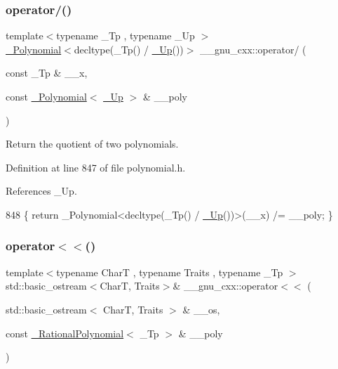 \subsubsection{\texorpdfstring{operator/()}{operator/()}\hspace{0.1cm}{\footnotesize\ttfamily [3/3]}}
{\footnotesize\ttfamily template$<$typename \+\_\+\+Tp , typename \+\_\+\+Up $>$ \\
\hyperlink{class____gnu__cxx_1_1__Polynomial}{\+\_\+\+Polynomial}$<$decltype(\+\_\+\+Tp() / \hyperlink{namespace____gnu__cxx_ab693ea357b6429b331e0bf09f9442385}{\+\_\+\+Up}())$>$ \+\_\+\+\_\+gnu\+\_\+cxx\+::operator/ (\begin{DoxyParamCaption}\item[{const \+\_\+\+Tp \&}]{\+\_\+\+\_\+x,  }\item[{const \hyperlink{class____gnu__cxx_1_1__Polynomial}{\+\_\+\+Polynomial}$<$ \hyperlink{namespace____gnu__cxx_ab693ea357b6429b331e0bf09f9442385}{\+\_\+\+Up} $>$ \&}]{\+\_\+\+\_\+poly }\end{DoxyParamCaption})\hspace{0.3cm}{\ttfamily [inline]}}

Return the quotient of two polynomials. 

Definition at line 847 of file polynomial.\+h.



References \+\_\+\+Up.


\begin{DoxyCode}
848     \{ \textcolor{keywordflow}{return} \_Polynomial<decltype(\_Tp() / \hyperlink{namespace____gnu__cxx_ab693ea357b6429b331e0bf09f9442385}{\_Up}())>(\_\_x) /= \_\_poly; \}
\end{DoxyCode}
\mbox{\label{namespace____gnu__cxx_a424044092ac184bfa1d17beb1b12e071}} 
\subsubsection{\texorpdfstring{operator$<$$<$()}{operator<<()}\hspace{0.1cm}{\footnotesize\ttfamily [1/2]}}
{\footnotesize\ttfamily template$<$typename CharT , typename Traits , typename \+\_\+\+Tp $>$ \\
std\+::basic\+\_\+ostream$<$CharT, Traits$>$\& \+\_\+\+\_\+gnu\+\_\+cxx\+::operator$<$$<$ (\begin{DoxyParamCaption}\item[{std\+::basic\+\_\+ostream$<$ CharT, Traits $>$ \&}]{\+\_\+\+\_\+os,  }\item[{const \hyperlink{class____gnu__cxx_1_1__RationalPolynomial}{\+\_\+\+Rational\+Polynomial}$<$ \+\_\+\+Tp $>$ \&}]{\+\_\+\+\_\+poly }\end{DoxyParamCaption})}


